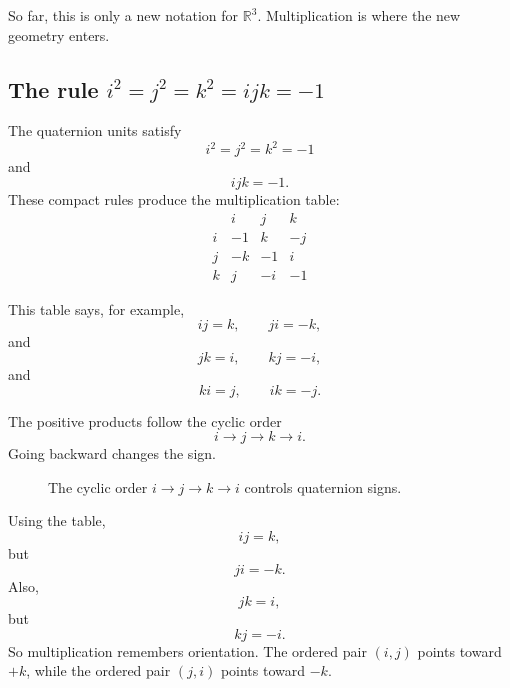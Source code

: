 So far, this is only a new notation for \(\mathbb R^3\).  Multiplication is where the new
geometry enters.

\subsection{The rule \(i^2=j^2=k^2=ijk=-1\)}

The quaternion units satisfy
\[
    i^2=j^2=k^2=-1
\]
and
\[
    ijk=-1.
\]
These compact rules produce the multiplication table:
\[
\begin{array}{c|ccc}
     & i & j & k \\ \hline
i & -1 & k & -j\\
j & -k & -1 & i\\
k & j & -i & -1
\end{array}
\]

This table says, for example,
\[
    ij=k,
    \qquad
    ji=-k,
\]
and
\[
    jk=i,
    \qquad
    kj=-i,
\]
and
\[
    ki=j,
    \qquad
    ik=-j.
\]

The positive products follow the cyclic order
\[
    i\longrightarrow j\longrightarrow k\longrightarrow i.
\]
Going backward changes the sign.

\begin{figure}[h]
\centering
{}
\caption{The cyclic order \(i\to j\to k\to i\) controls quaternion signs.}
\end{figure}

\begin{example}
Using the table,
\[
    ij=k,
\]
but
\[
    ji=-k.
\]
Also,
\[
    jk=i,
\]
but
\[
    kj=-i.
\]
So multiplication remembers orientation.  The ordered pair \((i,j)\) points toward
\(+k\), while the ordered pair \((j,i)\) points toward \(-k\).
\end{example}

